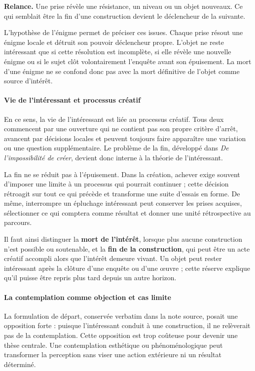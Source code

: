 \documentclass[10pt,a4paper]{article}
\begin{document}
\textbf{Relance.} Une prise révèle une résistance, un niveau ou un objet nouveaux. Ce qui semblait être la fin d'une construction devient le déclencheur de la suivante.

L'hypothèse de l'énigme permet de préciser ces issues. Chaque prise résout une énigme locale et détruit son pouvoir déclencheur propre. L'objet ne reste intéressant que si cette résolution est incomplète, si elle révèle une nouvelle énigme ou si le sujet clôt volontairement l'enquête avant son épuisement. La mort d'une énigme ne se confond donc pas avec la mort définitive de l'objet comme source d'intérêt.

\paragraph{Vie de l'intéressant et processus créatif}
En ce sens, la vie de l'intéressant est liée au processus créatif. Tous deux commencent par une ouverture qui ne contient pas son propre critère d'arrêt, avancent par décisions locales et peuvent toujours faire apparaître une variation ou une question supplémentaire. Le problème de la fin, développé dans \emph{De l'impossibilité de créer}, devient donc interne à la théorie de l'intéressant.

La fin ne se réduit pas à l'épuisement. Dans la création, achever exige souvent d'imposer une limite à un processus qui pourrait continuer ; cette décision rétroagit sur tout ce qui précède et transforme une suite d'essais en forme. De même, interrompre un épluchage intéressant peut conserver les prises acquises, sélectionner ce qui comptera comme résultat et donner une unité rétrospective au parcours.

Il faut ainsi distinguer la \textbf{mort de l'intérêt}, lorsque plus aucune construction n'est possible ou soutenable, et la \textbf{fin de la construction}, qui peut être un acte créatif accompli alors que l'intérêt demeure vivant. Un objet peut rester intéressant après la clôture d'une enquête ou d'une œuvre ; cette réserve explique qu'il puisse être repris plus tard depuis un autre horizon.

\paragraph{La contemplation comme objection et cas limite}
La formulation de départ, conservée verbatim dans la note source, posait une opposition forte : puisque l'intéressant conduit à une construction, il ne relèverait pas de la contemplation. Cette opposition est trop coûteuse pour devenir une thèse centrale. Une contemplation esthétique ou phénoménologique peut transformer la perception sans viser une action extérieure ni un résultat déterminé.
\end{document}
